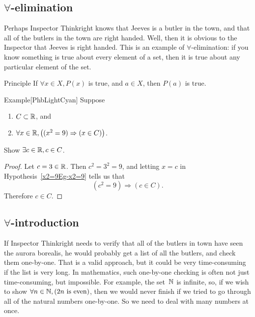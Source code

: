 \documentclass[../MATH-2000-Notes.tex]{subfiles}
\begin{document}
\subsection{\texorpdfstring{$\forall$}{}-elimination}
Perhaps Inspector Thinkright knows that Jeeves is a butler in the town, and that all of the butlers in the town are right handed. Well, then it is obvious to the Inspector that Jeeves is right handed. This is an example of $\forall$-elimination: if you know something is true about every element of a set, then it is true about any particular element of the set.
\begin{paperbox}{Principle}
    If $\forall x \in X, P(x)$ is true, and $a \in X$, then $P(a)$ is true.
\end{paperbox}
\begin{commentbox}{Example}[{PhbLightCyan}]
    Suppose 
    \begin{enumerate}
        \item $C \subset \mathbb{R}$, 
        and
        \item \label{x2=9Eg-x2=9}
        $\forall x \in \mathbb{R}, \bigl( (x^2 = 9) \Rightarrow (x \in C) \bigr)$.
    \end{enumerate}
Show $\exists c \in \mathbb{R}, c \in C$.
\end{commentbox}
\begin{proof}
    Let $c = 3 \in \mathbb{R}$. Then $c^2 = 3^2 = 9$, and letting $x = c$ in Hypothesis~\ref{x2=9Eg-x2=9}  tells us that
        $$( c^2 = 9) \Rightarrow ( c \in C) .$$
    Therefore $c \in C$.
\end{proof}

\subsection{\texorpdfstring{$\forall$}{}-introduction}
If Inspector Thinkright needs to verify that all of the butlers in town have seen the aurora borealis, he would probably get a list of all the butlers, and check them one-by-one. That is a valid approach, but it could be very time-consuming if the list is very long. In mathematics, such one-by-one checking is often not just time-consuming, but impossible. For example, the set~$\mathbb{N}$ is infinite, so, if we wish to show $\forall n \in \mathbb{N}, (\text{$2n$ is even})$, then we would never finish if we tried to go through all of the natural numbers one-by-one. So we need to deal with many numbers at once. 
\end{document}

